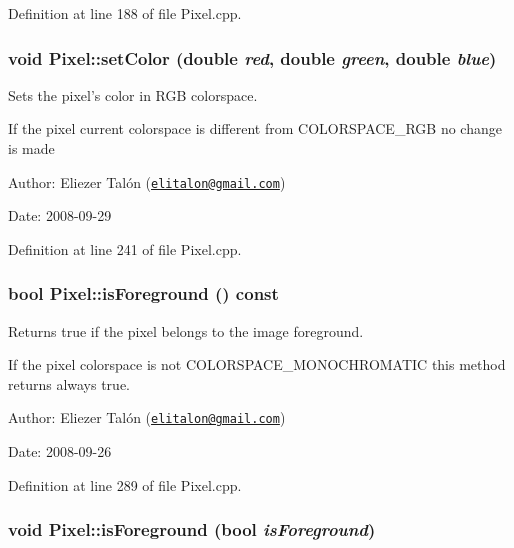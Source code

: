 Definition at line 188 of file Pixel.cpp.\hypertarget{class_pixel_5543267a64a29c66f12a2801b101e6db}{
\subsubsection[setColor]{\setlength{\rightskip}{0pt plus 5cm}void Pixel::setColor (double {\em red}, \/  double {\em green}, \/  double {\em blue})}}
\label{class_pixel_5543267a64a29c66f12a2801b101e6db}


Sets the pixel's color in RGB colorspace. 

If the pixel current colorspace is different from COLORSPACE\_\-RGB no change is made

\begin{Desc}
\item[Author:]Eliezer Talón (\href{mailto:elitalon@gmail.com}{\tt elitalon@gmail.com}) \end{Desc}
\begin{Desc}
\item[Date:]2008-09-29 \end{Desc}


Definition at line 241 of file Pixel.cpp.\hypertarget{class_pixel_48f2d29f9542f9c2ce293422ab07ffcc}{
\subsubsection[isForeground]{\setlength{\rightskip}{0pt plus 5cm}bool Pixel::isForeground () const}}
\label{class_pixel_48f2d29f9542f9c2ce293422ab07ffcc}


Returns true if the pixel belongs to the image foreground. 

If the pixel colorspace is not COLORSPACE\_\-MONOCHROMATIC this method returns always true.

\begin{Desc}
\item[Author:]Eliezer Talón (\href{mailto:elitalon@gmail.com}{\tt elitalon@gmail.com}) \end{Desc}
\begin{Desc}
\item[Date:]2008-09-26 \end{Desc}


Definition at line 289 of file Pixel.cpp.\hypertarget{class_pixel_1b1d5b2ed9285b837d85c33f09cab3f9}{
\subsubsection[isForeground]{\setlength{\rightskip}{0pt plus 5cm}void Pixel::isForeground (bool {\em isForeground})}}
\label{class_pixel_1b1d5b2ed9285b837d85c33f09cab3f9}


